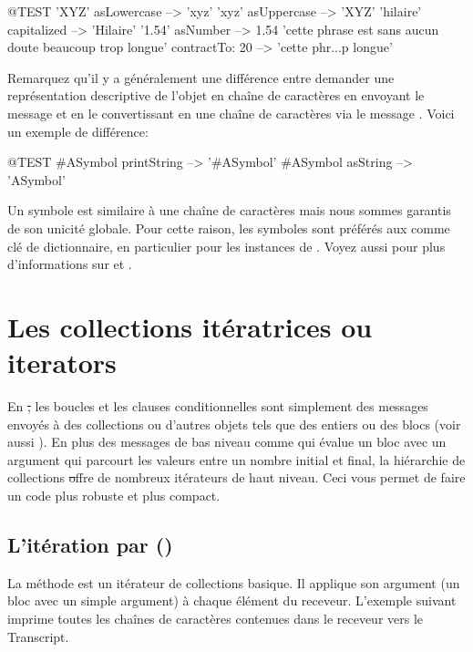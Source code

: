 \documentclass[a4paper,10pt,twoside]{book}
\begin{document}
\begin{code}{@TEST}
'XYZ' asLowercase --> 'xyz'
'xyz' asUppercase   --> 'XYZ'
'hilaire' capitalized   --> 'Hilaire'
'1.54' asNumber      --> 1.54
'cette phrase est sans aucun doute beaucoup trop longue' contractTo: 20 -->  'cette phr...p longue'
\end{code}

Remarquez qu'il y a généralement une différence entre demander une
représentation descriptive de l'objet en chaîne de caractères
en envoyant le message
 et en le convertissant en une chaîne de caractères via le message .
Voici un exemple de différence:

\begin{code}{@TEST}
#ASymbol printString --> '#ASymbol'
#ASymbol asString    --> 'ASymbol'
\end{code}

Un symbole  est similaire à une chaîne de caractères
mais nous sommes garantis de son unicité globale. Pour cette raison,
les symboles sont préférés aux  comme clé de dictionnaire,
en particulier pour les instances de .
Voyez aussi  pour plus d'informations sur  et .

\section{Les collections itératrices ou iterators}

En \st, les boucles et les clauses conditionnelles sont simplement
des messages envoyés à des collections ou d'autres objets
tels que des entiers ou des blocs (voir aussi ).
En plus des messages de bas niveau comme  qui évalue un bloc avec un argument qui parcourt les valeurs entre un nombre initial et final,
la hiérarchie de collections \st offre de nombreux itérateurs de haut niveau.
Ceci vous permet de faire un code plus robuste et plus compact.

\subsection{L'itération par ()}
La méthode  est un itérateur de collections basique.
Il applique son argument (un bloc avec un simple argument) à chaque
élément du receveur.
L'exemple suivant imprime toutes les chaînes de caractères
contenues dans le receveur vers le Transcript.
\end{document}
